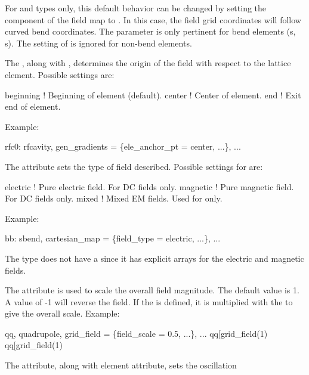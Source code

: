 \begin{description}
For  and  types only, this default behavior can be changed by
setting the  component of the field map to . In this case,
the field grid coordinates will follow curved bend coordinates.  The 
parameter is only pertinent for bend elements (s, s).  The setting of
 is ignored for non-bend elements.
%
\item[ele_anchor_pt] \Newline
The , along with , determines the origin of the field with
respect to the lattice element. Possible settings are:
\begin{example}
  beginning   ! Beginning of element (default).
  center      ! Center of element.
  end         ! Exit end of element.
\end{example}
Example:
\begin{example}
  rfc0: rfcavity, gen_gradients = \{ele_anchor_pt = center, ...\}, ...
\end{example}
%
\item[field_type] \Newline
The  attribute sets the type of field described. Possible settings for
 are:
\begin{example}
  electric      ! Pure electric field. For DC fields only.
  magnetic      ! Pure magnetic field. For DC fields only.
  mixed         ! Mixed EM fields. Used for  only.
\end{example}
Example:
\begin{example}
  bb: sbend, cartesian_map = \{field_type = electric, ...\}, ...
\end{example}
The  type does not have a  since it has explicit arrays
for the electric and magnetic fields.
%
\item[field_scale] \Newline
The  attribute is used to scale the overall field magnitude. The default
value is 1. A value of -1 will reverse the field. If the  is
defined, it is multiplied with the  to give the overall scale.
Example:
\begin{example}
  qq, quadrupole, grid_field = \{field_scale = 0.5, ...\}, ...
  qq[grid_field(1)%
  qq[grid_field(1)%
\end{example}
%
\item[harmonic] \Newline
The  attribute, along with  element attribute, sets the oscillation

\end{description}
